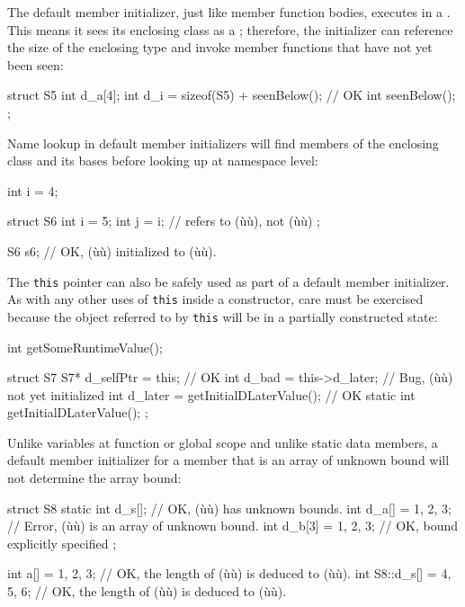 The default member initializer, just like member function bodies,
executes in a . This means it sees its
enclosing class as a ; therefore, the initializer
can reference the size of the enclosing type and invoke member functions
that have not yet been seen:

\begin{emcppslisting}
struct S5
{
    int d_a[4];
    int d_i = sizeof(S5) + seenBelow();  // OK
    int seenBelow();
};
\end{emcppslisting}
    

Name lookup in default member initializers will find members of the
enclosing class and its bases before looking up at namespace level:

\begin{emcppslisting}
int i = 4;

struct S6
{
    int i = 5;
    int j = i;  // refers to (ù{}ù), not (ù{}ù)
};

S6 s6;  // OK, (ù{}ù) initialized to (ù{}ù).
\end{emcppslisting}
    

The \lstinline!this! pointer can also be safely used as part of a default
member initializer. As with any other uses of \lstinline!this! inside a
constructor, care must be exercised because the object referred to by
\lstinline!this! will be in a partially constructed state:

\begin{emcppslisting}
int getSomeRuntimeValue();

struct S7
{
    S7* d_selfPtr = this;                   // OK
    int d_bad = this->d_later;              // Bug, (ù{}ù) not yet initialized
    int d_later = getInitialDLaterValue();  // OK
    static int getInitialDLaterValue();
};
\end{emcppslisting}
    

Unlike variables at function or global scope and unlike static data
members, a default member initializer for a member that is an array of
unknown bound will not determine the array bound:

\begin{emcppslisting}
struct S8
{
    static int d_s[];        // OK, (ù{}ù) has unknown bounds.
    int d_a[] = {1, 2, 3};   // Error, (ù{}ù) is an array of unknown bound.
    int d_b[3] = {1, 2, 3};  // OK, bound explicitly specified
};

int a[] = {1, 2, 3};         // OK, the length of (ù{}ù) is deduced to (ù{}ù).
int S8::d_s[] = {4, 5, 6};   // OK, the length of (ù{}ù) is deduced to (ù{}ù).
\end{emcppslisting}
    

